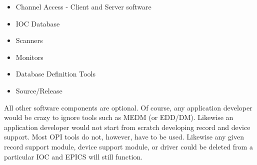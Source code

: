 \begin{itemize}\item Channel Access - Client and Server software

\item IOC Database

\item Scanners

\item Monitors

\item Database Definition Tools

\item Source/Release

\end{itemize}All other software components are optional. Of course, any application developer would be crazy to ignore tools such as 
MEDM (or EDD/DM). Likewise an application developer would not start from scratch developing record and device 
support. Most OPI tools do not, however, have to be used. Likewise any given record support module, device support 
module, or driver could be deleted from a particular IOC and EPICS will still function.



